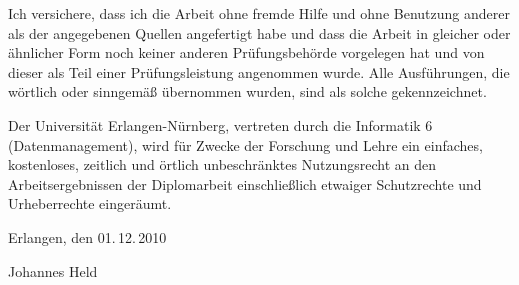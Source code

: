 \thispagestyle{empty}
Ich versichere, dass ich die Arbeit ohne fremde Hilfe und ohne Benutzung anderer als der angegebenen Quellen angefertigt habe und dass die Arbeit in gleicher oder ähnlicher Form noch keiner anderen Prüfungsbehörde vorgelegen hat und von dieser als Teil einer Prüfungsleistung angenommen wurde. Alle Ausführungen, die wörtlich oder sinngemäß übernommen wurden, sind als solche gekennzeichnet.
\vspace{2cm}

Der Universität Erlangen-Nürnberg, vertreten durch die Informatik 6 (Datenmanagement), wird für Zwecke der Forschung und Lehre ein einfaches, kostenloses, zeitlich und örtlich unbeschränktes Nutzungsrecht an den Arbeitsergebnissen der Diplomarbeit einschließlich etwaiger Schutzrechte und Urheberrechte eingeräumt.

\vspace{2cm}
Erlangen, den 01.\,12.\,2010

\vspace{2cm}
Johannes Held \hfill \ 

\vspace{0,5cm}

\clearpage{\pagestyle{empty}\cleardoublepage}
